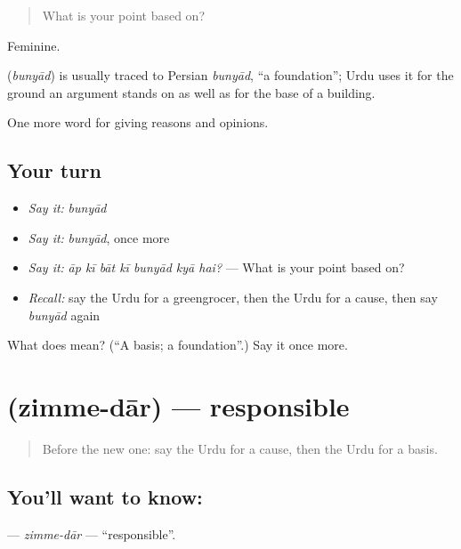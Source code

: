 \begin{quote}
What is your point based on?
\end{quote}

Feminine.

\begin{cousinweb}
\textbf{} (\emph{bunyād}) is usually traced to Persian \emph{bunyād}, \textquotedblleft{}a foundation\textquotedblright{}; Urdu uses it for the ground an argument stands on as well as for the base of a building.
\end{cousinweb}

\begin{grammarlens}[title={What you've built}]
One more word for giving reasons and opinions.
\end{grammarlens}

\subsection*{Your turn}
\begin{itemize}
\raggedright
  \item \emph{Say it:} \emph{bunyād}
  \item \emph{Say it:} \emph{bunyād}, once more
  \item \emph{Say it:} \emph{āp kī bāt kī bunyād kyā hai?} — What is your point based on?
  \item \emph{Recall:} say the Urdu for a greengrocer, then the Urdu for a cause, then say \emph{bunyād} again
\end{itemize}

\begin{tcolorbox}[breakable,colback=teal!4,colframe=teal!35!black,title={Before you move on}]
What does  mean? (\textquotedblleft{}A basis; a foundation\textquotedblright{}.) Say it once more.
\end{tcolorbox}
\section[\texorpdfstring{\ur{ذمہ} \ur{دار} (zimme-dār)}{ذمہ دار (zimme-dār)}]{  (zimme-dār) — responsible}

\label{lesson:UR-C331-zimme-dar}



\begin{quote}
Before the new one: say the Urdu for a cause, then the Urdu for a basis.
\end{quote}

\subsection*{You'll want to know:  }
\textbf{ } — \emph{zimme-dār} — \textquotedblleft{}responsible\textquotedblright{}.

